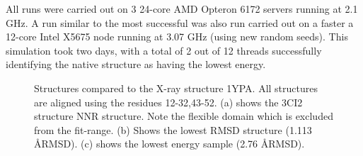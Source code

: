 All runs were carried out on 3 24-core AMD Opteron 6172 servers running at 2.1 GHz. A run similar to the most successful was also run carried out on a faster a 12-core Intel X5675 node running at 3.07 GHz (using new random seeds).
This simulation took two days, with a total of 2 out of 12 threads successfully identifying the native structure as having the lowest energy.

\begin{figure}%
    \centering
    \caption{Structures compared to the X-ray structure 1YPA. All structures are aligned using the residues 12-32,43-52. (a) shows the 3CI2 structure NNR structure. Note the flexible domain which is excluded from the fit-range. (b) Shows the lowest RMSD structure (1.113 \AA RMSD). (c) shows the lowest energy sample (2.76 \AA RMSD). }
    \label{fig:ci2}%
\end{figure}

